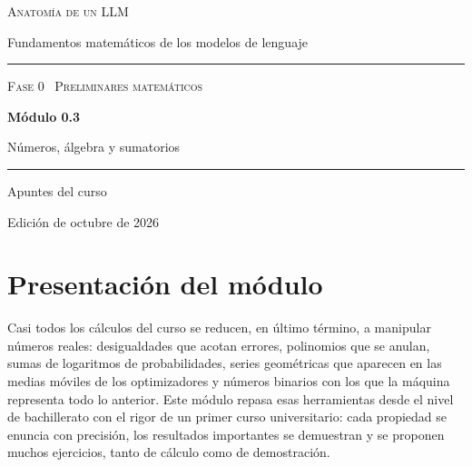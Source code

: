 \documentclass[11pt,a4paper,twoside,openany]{book}
\begin{document}
\frontmatter
\begin{titlepage}
\centering
\vspace*{2.5cm}
{\large\scshape Anatomía de un LLM}\par
\vspace{0.4cm}
{\normalsize Fundamentos matemáticos de los modelos de lenguaje}\par
\vspace{2.2cm}
\rule{\textwidth}{0.8pt}\par\vspace{0.5cm}
{\small\scshape Fase 0 \textperiodcentered\ Preliminares matemáticos}\par\vspace{0.3cm}
{\Huge\bfseries Módulo 0.3\par}\vspace{0.3cm}
{\LARGE Números, álgebra y sumatorios\par}
\vspace{0.5cm}\rule{\textwidth}{0.4pt}\par
\vspace{1.6cm}
{\large Apuntes del curso}\par
\vfill
{\small Edición de octubre de 2026}\par
\end{titlepage}

\chapter*{Presentación del módulo}

Casi todos los cálculos del curso se reducen, en último término, a manipular números reales: desigualdades que acotan errores, polinomios que se anulan, sumas de logaritmos de probabilidades, series geométricas que aparecen en las medias móviles de los optimizadores y números binarios con los que la máquina representa todo lo anterior. Este módulo repasa esas herramientas desde el nivel de bachillerato con el rigor de un primer curso universitario: cada propiedad se enuncia con precisión, los resultados importantes se demuestran y se proponen muchos ejercicios, tanto de cálculo como de demostración.
\end{document}
